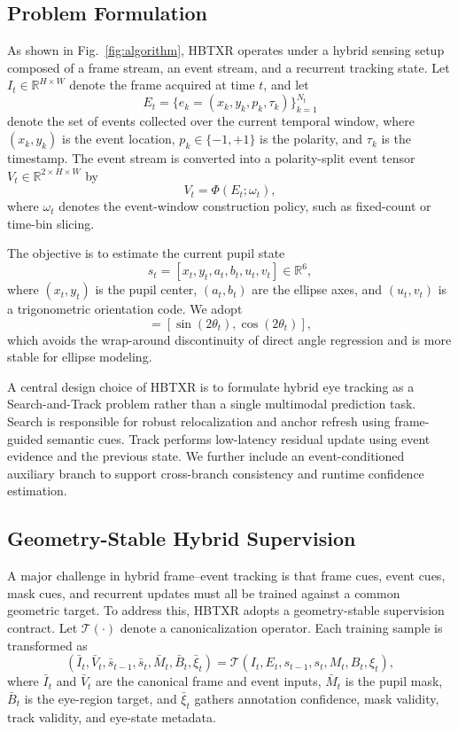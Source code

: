 \documentclass[journal]{IEEEtran}
\begin{document}
\subsection{Problem Formulation}
As shown in Fig.~\ref{fig:algorithm}, HBTXR operates under a hybrid sensing setup composed of a frame stream, an event stream, and a recurrent tracking state. Let $I_t \in \mathbb{R}^{H\times W}$ denote the frame acquired at time $t$, and let
\begin{equation}
E_t = \{e_k=(x_k,y_k,p_k,\tau_k)\}_{k=1}^{N_t}
\end{equation}
denote the set of events collected over the current temporal window, where $(x_k,y_k)$ is the event location, $p_k\in\{-1,+1\}$ is the polarity, and $\tau_k$ is the timestamp. The event stream is converted into a polarity-split event tensor $V_t\in\mathbb{R}^{2\times H\times W}$ by
\begin{equation}
V_t = \Phi(E_t;\omega_t),
\end{equation}
where $\omega_t$ denotes the event-window construction policy, such as fixed-count or time-bin slicing.

The objective is to estimate the current pupil state
\begin{equation}
s_t=[x_t,y_t,a_t,b_t,u_t,v_t]\in\mathbb{R}^{6},
\end{equation}
where $(x_t,y_t)$ is the pupil center, $(a_t,b_t)$ are the ellipse axes, and $(u_t,v_t)$ is a trigonometric orientation code. We adopt
\begin{equation}
[u_t,v_t]=[\sin(2\theta_t),\cos(2\theta_t)],
\end{equation}
which avoids the wrap-around discontinuity of direct angle regression and is more stable for ellipse modeling.

A central design choice of HBTXR is to formulate hybrid eye tracking as a Search-and-Track problem rather than a single multimodal prediction task. Search is responsible for robust relocalization and anchor refresh using frame-guided semantic cues. Track performs low-latency residual update using event evidence and the previous state. We further include an event-conditioned auxiliary branch to support cross-branch consistency and runtime confidence estimation.

\subsection{Geometry-Stable Hybrid Supervision}
A major challenge in hybrid frame--event tracking is that frame cues, event cues, mask cues, and recurrent updates must all be trained against a common geometric target. To address this, HBTXR adopts a geometry-stable supervision contract. Let $\mathcal{T}(\cdot)$ denote a canonicalization operator. Each training sample is transformed as
\begin{equation}
(\bar I_t,\bar V_t,\bar s_{t-1},\bar s_t,\bar M_t,\bar B_t,\bar \xi_t)
=\mathcal{T}(I_t,E_t,s_{t-1},s_t,M_t,B_t,\xi_t),
\end{equation}
where $\bar I_t$ and $\bar V_t$ are the canonical frame and event inputs, $\bar M_t$ is the pupil mask, $\bar B_t$ is the eye-region target, and $\bar \xi_t$ gathers annotation confidence, mask validity, track validity, and eye-state metadata.
\end{document}
